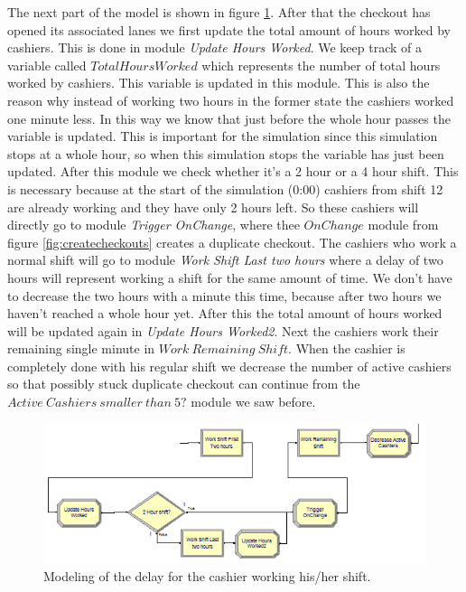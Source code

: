 The next part of the model is shown in figure \ref{fig:workshift}. 
After that the checkout has opened its associated lanes we first update the total amount of hours worked by cashiers. 
This is done in module \textit{Update Hours Worked}. 
We keep track of a variable called $TotalHoursWorked$ which represents the number of total hours worked by cashiers. 
This variable is updated in this module. 
This is also the reason why instead of working two hours in the former state the cashiers worked one minute less. 
In this way we know that just before the whole hour passes the variable is updated. 
This is important for the simulation since this simulation stops at a whole hour, so when this simulation stops the variable has just been updated.
After this module we check whether it's a 2 hour or a 4 hour shift. 
This is necessary because at the start of the simulation (0:00) cashiers from shift 12 are already working and they have only 2 hours left. 
So these cashiers will directly go to module \textit{Trigger OnChange}, where thee $OnChange$ module from figure \ref{fig:createcheckouts} creates a duplicate checkout.
The cashiers who work a normal shift will go to module \textit{Work Shift Last two hours} where a delay of two hours will represent working a shift for the same amount of time. 
We don't have to decrease the two hours with a minute this time, because after two hours we haven't reached a whole hour yet.
After this the total amount of hours worked will be updated again in \textit{Update Hours Worked2}. 
Next the cashiers work their remaining single minute in $Work \ Remaining \ Shift$. 
When the cashier is completely done with his regular shift we decrease the number of active cashiers so that possibly stuck duplicate checkout can continue from the $Active \ Cashiers \ smaller \ than \ 5?$ module we saw before.

\begin{figure}[h!]
\begin{center}
	\includegraphics[scale=1]{images/model-description/work-shift.PNG}
	\caption{Modeling of the delay for the cashier working his/her shift.}
	\label{fig:workshift}
\end{center}
\end{figure}

